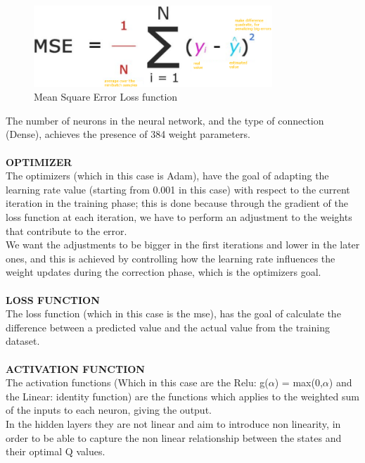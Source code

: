 \documentclass{article}
\begin{document}
\begin{figure}[h]
    \centering
    \includegraphics[width=0.8\textwidth]{Mean_square_error_function.png}
    \caption{Mean Square Error Loss function}
    \label{mse_loss:}

\end{figure}

The number of neurons in the neural network, and the type of connection (Dense), achieves the presence of 384 weight parameters.
\\
\\
\textbf{OPTIMIZER}
\\
The optimizers (which in this case is Adam), have the goal of adapting the learning rate value (starting from 0.001 in this case) with respect to the current iteration in the training phase; this is done because through the gradient of the loss function at each iteration, we have to perform an adjustment to the weights that contribute to the error.
\\
We want the adjustments to be bigger in the first iterations and lower in the later ones, and this is achieved by controlling how the learning rate influences the weight updates during the correction phase, which is the optimizers goal.
\\
\\
\textbf{LOSS FUNCTION}
\\
The loss function (which in this case is the mse), has the goal of calculate the difference between a predicted value and the actual value from the training dataset.
\\
\\
\textbf{ACTIVATION FUNCTION}
\\
The activation functions (Which in this case are the Relu: g($\alpha$) = max(0,$\alpha$) and the Linear: identity function) are the functions which applies to the weighted sum of the inputs to each neuron, giving the output.
\\
In the hidden layers they are not linear and aim to introduce non linearity, in order to be able to capture the non linear relationship between the states and their optimal Q values.
\\
\end{document}
